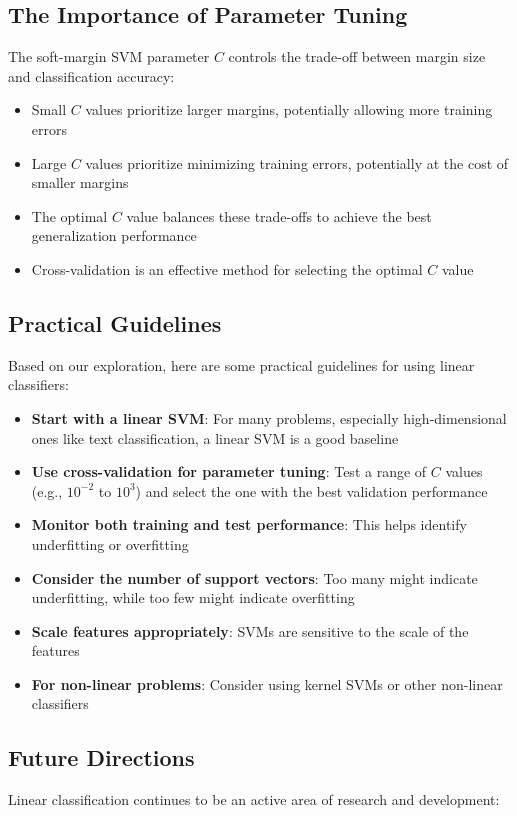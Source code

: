 \documentclass{article}
\begin{document}
\subsection{The Importance of Parameter Tuning}
The soft-margin SVM parameter $C$ controls the trade-off between margin size and classification accuracy:

\begin{itemize}
    \item Small $C$ values prioritize larger margins, potentially allowing more training errors
    \item Large $C$ values prioritize minimizing training errors, potentially at the cost of smaller margins
    \item The optimal $C$ value balances these trade-offs to achieve the best generalization performance
    \item Cross-validation is an effective method for selecting the optimal $C$ value
\end{itemize}

\subsection{Practical Guidelines}
Based on our exploration, here are some practical guidelines for using linear classifiers:

\begin{itemize}
    \item \textbf{Start with a linear SVM}: For many problems, especially high-dimensional ones like text classification, a linear SVM is a good baseline
    \item \textbf{Use cross-validation for parameter tuning}: Test a range of $C$ values (e.g., $10^{-2}$ to $10^3$) and select the one with the best validation performance
    \item \textbf{Monitor both training and test performance}: This helps identify underfitting or overfitting
    \item \textbf{Consider the number of support vectors}: Too many might indicate underfitting, while too few might indicate overfitting
    \item \textbf{Scale features appropriately}: SVMs are sensitive to the scale of the features
    \item \textbf{For non-linear problems}: Consider using kernel SVMs or other non-linear classifiers
\end{itemize}

\subsection{Future Directions}
Linear classification continues to be an active area of research and development:
\end{document}
